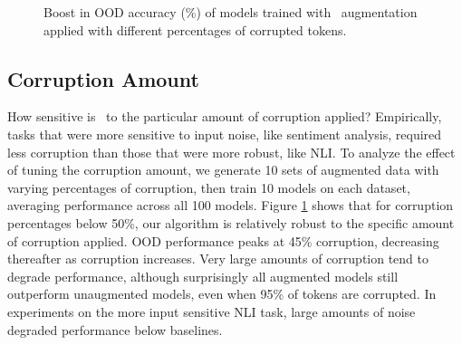 \begin{figure}[t]
\centering
{}
\caption{Boost in OOD accuracy (\%) of models trained with \ssmba\ augmentation applied with different percentages of corrupted tokens.}
\label{fig:perturbation_exp}
\end{figure}

\subsection{Corruption Amount}
\label{subsec:noise_exp}
How sensitive is \ssmba\ to the particular amount of corruption applied?
Empirically,
tasks that were more sensitive to input noise, like sentiment analysis, required less corruption than those that were more robust, like NLI.
To analyze the effect of tuning the corruption amount, we generate 10 sets of augmented data with varying percentages of corruption, then train 10 models on each dataset, averaging performance across all 100 models.
Figure \ref{fig:perturbation_exp} shows that for corruption percentages below 50\%, our algorithm is relatively robust to the specific amount of corruption applied.
OOD performance peaks at 45\% corruption, decreasing thereafter as corruption increases.
Very large amounts of corruption tend to degrade performance, although surprisingly all augmented models still outperform unaugmented models, even when 95\% of tokens are corrupted.
In experiments on the more input sensitive NLI task, large amounts of noise degraded performance below baselines.



